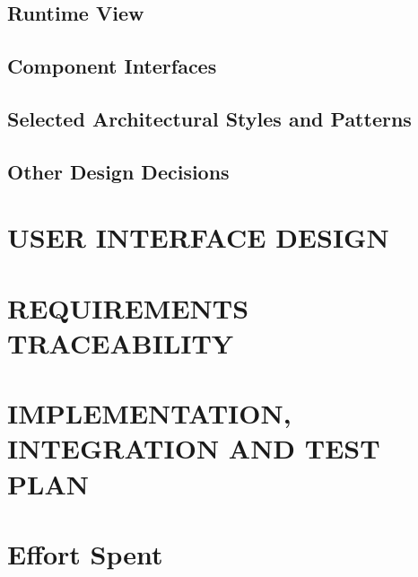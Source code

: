 \documentclass[a4paper,12pt]{report}
\begin{document}
\section{Runtime View}




\section{Component Interfaces}\label{sec:component-interfaces}


\section{Selected Architectural Styles and Patterns}\label{sec:SelectedArchitecturalStylesAndPatterns}


\section{Other Design Decisions}

\chapter{USER INTERFACE DESIGN}\label{ch:user-interface-design}


\chapter{REQUIREMENTS TRACEABILITY}\label{ch:requirements-traceability}


\chapter{IMPLEMENTATION, INTEGRATION AND TEST PLAN}\label{ch:implementation-integration-and-test-plan}


\chapter{Effort Spent}
\end{document}
